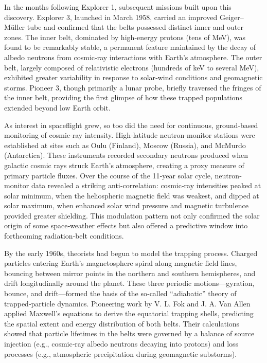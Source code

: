 \documentclass[12pt]{report}
\begin{document}
In the months following Explorer 1, subsequent missions built upon this discovery.  Explorer 3, launched in March 1958, carried an improved Geiger–Müller tube and confirmed that the belts possessed distinct inner and outer zones.  The inner belt, dominated by high‐energy protons (tens of MeV), was found to be remarkably stable, a permanent feature maintained by the decay of albedo neutrons from cosmic‐ray interactions with Earth’s atmosphere.  The outer belt, largely composed of relativistic electrons (hundreds of keV to several MeV), exhibited greater variability in response to solar‐wind conditions and geomagnetic storms.  Pioneer 3, though primarily a lunar probe, briefly traversed the fringes of the inner belt, providing the first glimpse of how these trapped populations extended beyond low Earth orbit.

As interest in spaceflight grew, so too did the need for continuous, ground‐based monitoring of cosmic‐ray intensity.  High‐latitude neutron‐monitor stations were established at sites such as Oulu (Finland), Moscow (Russia), and McMurdo (Antarctica).  These instruments recorded secondary neutrons produced when galactic cosmic rays struck Earth’s atmosphere, creating a proxy measure of primary particle fluxes.  Over the course of the 11‐year solar cycle, neutron‐monitor data revealed a striking anti‐correlation: cosmic‐ray intensities peaked at solar minimum, when the heliospheric magnetic field was weakest, and dipped at solar maximum, when enhanced solar wind pressure and magnetic turbulence provided greater shielding.  This modulation pattern not only confirmed the solar origin of some space‐weather effects but also offered a predictive window into forthcoming radiation‐belt conditions.

By the early 1960s, theorists had begun to model the trapping process.  Charged particles entering Earth’s magnetosphere spiral along magnetic field lines, bouncing between mirror points in the northern and southern hemispheres, and drift longitudinally around the planet.  These three periodic motions—gyration, bounce, and drift—formed the basis of the so‐called “adiabatic” theory of trapped‐particle dynamics.  Pioneering work by V. L. Fok and J. A. Van Allen applied Maxwell’s equations to derive the equatorial trapping shells, predicting the spatial extent and energy distribution of both belts.  Their calculations showed that particle lifetimes in the belts were governed by a balance of source injection (e.g., cosmic‐ray albedo neutrons decaying into protons) and loss processes (e.g., atmospheric precipitation during geomagnetic substorms).
\end{document}
